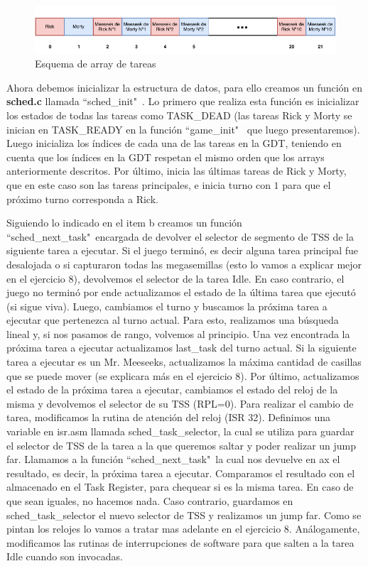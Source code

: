 \documentclass[a4paper]{article}
\begin{document}
\begin{figure}[h]
	\centering
	\includegraphics[scale=0.8]{img/ArrayRickyMortyIDX.pdf}
	\caption{Esquema de array de tareas}
\end{figure}

\justify
Ahora debemos inicializar la estructura de datos, para ello creamos un función en \textbf{sched.c} llamada ``sched_init"\ . Lo primero que realiza esta función es inicializar los estados de todas las tareas como TASK_DEAD (las tareas Rick y Morty se inician en TASK_READY en la función ``game_init" \ que luego presentaremos). Luego inicializa los índices de cada una de las tareas en la GDT, teniendo en cuenta que los índices en la GDT respetan el mismo orden que los arrays anteriormente descritos. Por último, inicia las últimas tareas de Rick y Morty, que en este caso son las tareas principales, e inicia turno con $1$ para que el próximo turno corresponda a Rick.

\justify
Siguiendo lo indicado en el item b creamos un función ``sched_next_task"\ encargada de devolver el selector de segmento de TSS de la siguiente tarea a ejecutar. Si el juego terminó, es decir alguna tarea principal fue desalojada o si capturaron todas las megasemillas (esto lo vamos a explicar mejor en el ejercicio $8$), devolvemos el selector de la tarea Idle. En caso contrario, el juego no terminó por ende actualizamos el estado de la última tarea que ejecutó (si sigue viva). Luego, cambiamos el turno y buscamos la próxima tarea a ejecutar que pertenezca al turno actual. Para esto, realizamos una búsqueda lineal y, si nos pasamos de rango, volvemos al principio. Una vez encontrada la próxima tarea a ejecutar actualizamos last_task del turno actual. Si la siguiente tarea a ejecutar es un Mr. Meeseeks, actualizamos la máxima cantidad de casillas que se puede mover (se explicara más en el ejercicio $8$). Por último, actualizamos el estado de la próxima tarea a ejecutar, cambiamos el estado del reloj de la misma y devolvemos el selector de su TSS (RPL=0).
\justify
Para realizar el cambio de tarea, modificamos la rutina de atención del reloj (ISR 32). Definimos una variable en isr.asm llamada sched_task_selector, la cual se utiliza para guardar el selector de TSS de la tarea a la que queremos saltar y poder realizar un jump far. Llamamos a la función ``sched_next_task"\ la cual nos devuelve en ax el resultado, es decir, la próxima tarea a ejecutar. Comparamos el resultado con el almacenado en el Task Register, para chequear si es la misma tarea. En caso de que sean iguales, no hacemos nada. Caso contrario, guardamos en sched_task_selector el nuevo selector de TSS y realizamos un jump far. Como se pintan los relojes lo vamos a tratar mas adelante en el ejercicio $8$.
\justify
Análogamente, modificamos las rutinas de interrupciones de software para que salten a la tarea Idle cuando son invocadas.
\end{document}
